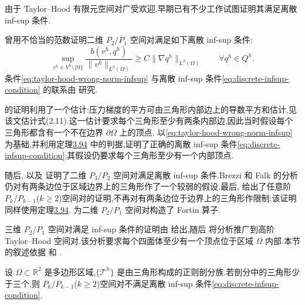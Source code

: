 \begin{note}\label{note:taylor-hood-history}
由于 Taylor--Hood 有限元空间对广受欢迎,早期已有不少工作试图证明其满足离散 inf-sup 条件.

\textcite{BercovierPironneau1979} 曾用不恰当的范数证明二维 $P_2/P_1$ 空间对满足如下离散 inf-sup 条件:
\begin{equation}\label{eq:taylor-hood-wrong-norm-infsup}
  \sup_{v^h\in V^h\setminus\{0\}}
      \frac{b(v^h,q^h)}{\|v^h\|_{L^2(\Omega)}}
  \ge C\|\nabla q^h\|_{L^2(\Omega)}
  \qquad\forall q^h\in Q^h.
\end{equation}
条件\cref{eq:taylor-hood-wrong-norm-infsup} 与离散 inf-sup 条件\cref{eq:discrete-infsup-condition} 的联系由 \textcite{GuzmanSalgadoSayas2013} 研究.

\textcite{BercovierPironneau1979} 的证明利用了一个估计:压力梯度的平方可由三角形内部边上的导数平方和估计,见该文估计式(2.11).这一估计要求每个三角形至少有两条内部边,因此当时假设每个三角形都含有一个不在边界 $\partial\Omega$ 上的顶点.\textcite{Verfurth1984} 以\cref{eq:taylor-hood-wrong-norm-infsup} 为基础,并利用定理\hyperref[thm:verfurth-continuous-pressure]{3.94} 中的判据,证明了正确的离散 inf-sup 条件\cref{eq:discrete-infsup-condition};其假设仍要求每个三角形至少有一个内部顶点.

随后,\textcite{Stenberg1990} 以及 \textcite{BrezziFalk1991} 证明了二维 $P_3/P_2$ 空间对满足离散 inf-sup 条件.Brezzi 和 Falk 的分析仍对有两条边位于区域边界上的三角形作了一个较弱的假设.最后,\textcite{Boffi1994} 给出了任意阶 $P_k/P_{k-1}$($k\ge2$)空间对的证明,不再对有两条边位于边界上的三角形作限制;该证明同样使用定理\hyperref[thm:verfurth-continuous-pressure]{3.94}.\textcite{MardalSchoberlWinther2013} 为二维 $P_2/P_1$ 空间对构造了 Fortin 算子.

三维 $P_2/P_1$ 空间对满足 inf-sup 条件的证明由 \textcite{Stenberg1987} 给出,随后 \textcite{Boffi1997} 将分析推广到高阶 Taylor--Hood 空间对.该分析要求每个四面体至少有一个顶点位于区域 $\Omega$ 内部.本节的叙述依据 \textcite[第 8.8.2 节]{Boffi2013} 和 \textcite{Boffi1994}.
\end{note}

\begin{lemma}\label{lem:taylor-hood-two-triangles}
设 $\Omega\subset\mathbb{R}^2$ 是多边形区域,$\{\mathcal{T}^h\}$ 是由三角形构成的正则剖分族.若剖分中的三角形少于三个,则 $P_k/P_{k-1}$($k\ge2$)空间对不满足离散 inf-sup 条件\cref{eq:discrete-infsup-condition}.
\end{lemma}

